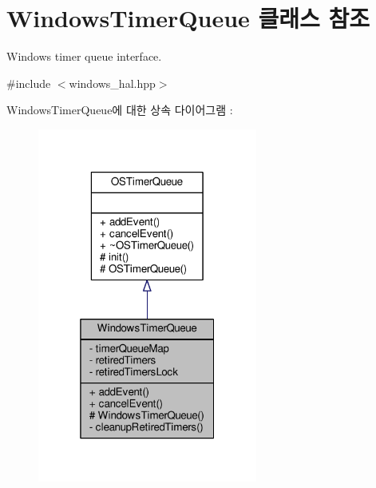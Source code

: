 \hypertarget{class_windows_timer_queue}{}\section{Windows\+Timer\+Queue 클래스 참조}
\label{class_windows_timer_queue}


Windows timer queue interface.  




{\ttfamily \#include $<$windows\+\_\+hal.\+hpp$>$}



Windows\+Timer\+Queue에 대한 상속 다이어그램 \+: 
\nopagebreak
\begin{figure}[H]
\begin{center}
\leavevmode
\includegraphics[width=205pt]{class_windows_timer_queue__inherit__graph}
\end{center}
\end{figure}


